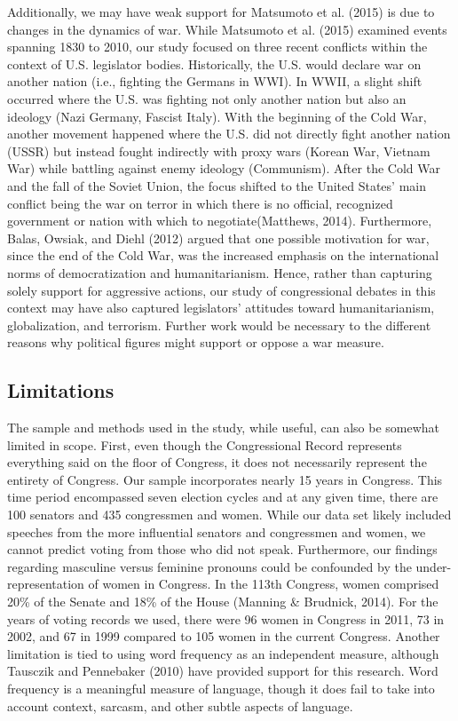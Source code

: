 \documentclass[
  english,
  ,man,floatsintext]{apa6}
\begin{document}
Additionally, we may have weak support for Matsumoto et al. (2015) is due to changes in the dynamics of war. While Matsumoto et al. (2015) examined events spanning 1830 to 2010, our study focused on three recent conflicts within the context of U.S. legislator bodies. Historically, the U.S. would declare war on another nation (i.e., fighting the Germans in WWI). In WWII, a slight shift occurred where the U.S. was fighting not only another nation but also an ideology (Nazi Germany, Fascist Italy). With the beginning of the Cold War, another movement happened where the U.S. did not directly fight another nation (USSR) but instead fought indirectly with proxy wars (Korean War, Vietnam War) while battling against enemy ideology (Communism). After the Cold War and the fall of the Soviet Union, the focus shifted to the United States' main conflict being the war on terror in which there is no official, recognized government or nation with which to negotiate(Matthews, 2014). Furthermore, Balas, Owsiak, and Diehl (2012) argued that one possible motivation for war, since the end of the Cold War, was the increased emphasis on the international norms of democratization and humanitarianism. Hence, rather than capturing solely support for aggressive actions, our study of congressional debates in this context may have also captured legislators' attitudes toward humanitarianism, globalization, and terrorism. Further work would be necessary to the different reasons why political figures might support or oppose a war measure.

\hypertarget{limitations}{%
\subsection{Limitations}\label{limitations}}

The sample and methods used in the study, while useful, can also be somewhat limited in scope. First, even though the Congressional Record represents everything said on the floor of Congress, it does not necessarily represent the entirety of Congress. Our sample incorporates nearly 15 years in Congress. This time period encompassed seven election cycles and at any given time, there are 100 senators and 435 congressmen and women. While our data set likely included speeches from the more influential senators and congressmen and women, we cannot predict voting from those who did not speak. Furthermore, our findings regarding masculine versus feminine pronouns could be confounded by the under-representation of women in Congress. In the 113th Congress, women comprised 20\% of the Senate and 18\% of the House (Manning \& Brudnick, 2014). For the years of voting records we used, there were 96 women in Congress in 2011, 73 in 2002, and 67 in 1999 compared to 105 women in the current Congress. Another limitation is tied to using word frequency as an independent measure, although Tausczik and Pennebaker (2010) have provided support for this research. Word frequency is a meaningful measure of language, though it does fail to take into account context, sarcasm, and other subtle aspects of language.
\end{document}
